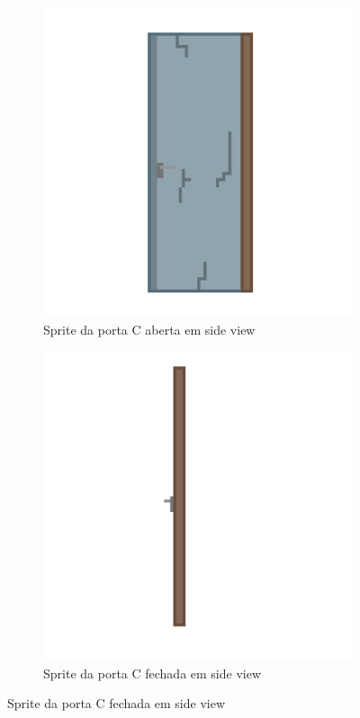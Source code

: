 \begin{figure}[htbp]
    \centering
    \caption{\small Sprites da porta C}
    \label{fig:portaC}
    \begin{subfigure}{0.45\textwidth}
    \includegraphics[width=1\linewidth]{figs/sprites/referencia_porta_tutorial (1).png}
    \caption{\small Sprite da porta C aberta em side view}
    \label{fig:portaCAberto}
    \end{subfigure}\hfill
    \begin{subfigure}{0.45\textwidth}
    \includegraphics[width=1\linewidth]{figs/sprites/referencia_porta_tutorial (2).png}
    \caption{\small Sprite da porta C fechada em side view}
    \label{fig:portaCFechado}

    \end{subfigure}\hfill
\end{figure}

